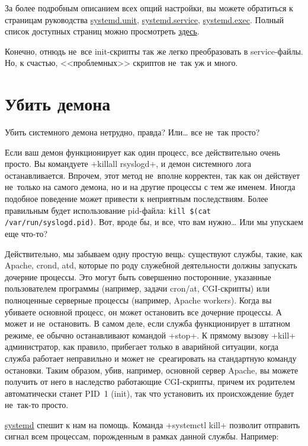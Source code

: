 \documentclass[10pt,oneside,a4paper]{article}
\begin{document}
За более подробным описанием всех опций настройки, вы можете обратиться к
страницам руководства
\href{http://0pointer.de/public/systemd-man/systemd.unit.html}{systemd.unit},
\href{http://0pointer.de/public/systemd-man/systemd.service.html}{systemd.service},
\href{http://0pointer.de/public/systemd-man/systemd.exec.html}{systemd.exec}. Полный
список доступных страниц можно просмотреть
\href{http://0pointer.de/public/systemd-man/}{здесь}.

Конечно, отнюдь не~все init-скрипты так же легко преобразовать в
service-файлы. Но, к счастью, <<проблемных>> скриптов не~так уж и много. 

\section{Убить демона}

Убить системного демона нетрудно, правда? Или\ldots{} все не~так просто?

Если ваш демон функционирует как один процесс, все действительно очень просто.
Вы командуете +killall rsyslogd+, и демон системного лога останавливается.
Впрочем, этот метод не~вполне корректен, так как он действует не~только на
самого демона, но и на другие процессы с тем же именем. Иногда подобное
поведение может привести к неприятным последствиям. Более правильным будет
использование pid-файла: \verb+kill $(cat /var/run/syslogd.pid)+. Вот, вроде
бы, и все, что вам нужно\ldots{} Или мы упускаем еще что-то?

Действительно, мы забываем одну простую вещь: существуют службы, такие, как
Apache, crond, atd, которые по роду служебной деятельности должны запускать
дочерние процессы. Это могут быть совершенно посторонние, указанные
пользователем программы (например, задачи cron/at, CGI-скрипты) или полноценные
серверные процессы (например, Apache workers). Когда вы убиваете основной
процесс, он может остановить все дочерние процессы. А может и не~остановить. В
самом деле, если служба функционирует в штатном режиме, ее обычно останавливают
командой +stop+. К прямому вызову +kill+ администратор, как правило,
прибегает только в аварийной ситуации, когда служба работает неправильно и
может не~среагировать на стандартную команду остановки. Таким образом, убив,
например, основной сервер Apache, вы можете получить от него в наследство
работающие CGI-скрипты, причем их родителем автоматически станет PID~1 (init),
так что установить их происхождение будет не~так-то просто. 

\href{http://www.freedesktop.org/wiki/Software/systemd}{systemd} спешит к нам
на помощь. Команда +systemctl kill+ позволит отправить сигнал всем
процессам, порожденным в рамках данной службы. Например: 
\end{document}
